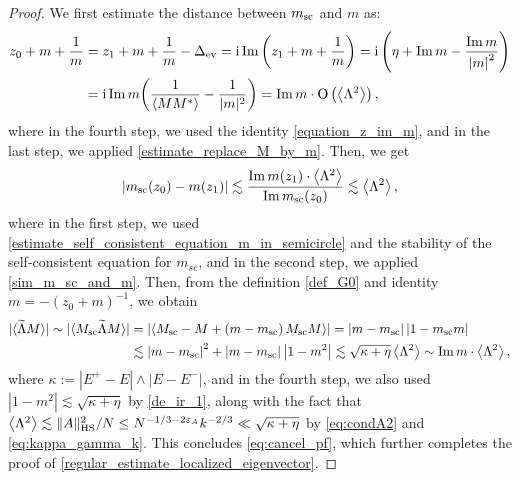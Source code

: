 \documentclass[10pt,reqno]{amsart}
\numberwithin{equation}{section}
\numberwithin{figure}{section}
\theoremstyle{plain} %
\theoremstyle{definition} %
\newcommand{\wt}{\widetilde}
\renewcommand{\txt}[1]{\text{\rm{#1}}}
\newcommand{\ii}{\mathrm{i}}
\renewcommand{\leq}{\le}
\newcommand{\pa}[1]{\left({#1}\right)}
\newcommand{\abs}[1]{\lvert #1 \rvert}
\newcommand{\absa}[1]{\left\lvert #1 \right\rvert}
\newcommand{\avg}[1]{\langle #1 \rangle}
\newcommand{\avga}[1]{\left\langle #1 \right\rangle}
\DeclareMathOperator{\im}{\mathrm{Im}}
\newcommand{\tLambda}{{\wt{\Lambda}}}
\newcommand{\OO}{\mathrm{O}}
\newcommand{\HS}{\txt{HS}}
\numberwithin{equation}{section}
\begin{document}
\begin{proof}
We first estimate the distance between $m_{\txt{sc}}$ and $m$ as:     \begin{equation}\label{estimate_self_consistent_equation_m_in_semicircle}
\begin{aligned}
z_0+m+\frac{1}{m}&=z_1+m+\frac{1}{m}-\Delta_{\txt{ev}}=\ii \im \pa{z_1+m+\frac{1}{m}}=\ii\pa{ \eta+\im m-\frac{\im m}{\absa{m}^2}}\\
&=\ii \im m\bigg(\frac{1}{\avga{MM^*}}-\frac{1}{|m|^2}\bigg)=\im m \cdot \OO\pa{\avga{\Lambda^2}},
\end{aligned}
\end{equation}
where in the fourth step, we used the identity \eqref{equation_z_im_m}, and in the last step, we applied \eqref{estimate_replace_M_by_m}. Then, we get  
    \begin{equation}\nonumber
        \begin{aligned}
            \absa{m_{\txt{sc}}(z_0)-m(z_1)}\lesssim \frac{\im m(z_1) \cdot \avga{\Lambda^2}}{\im m_{\txt{sc}}(z_0)}\lesssim\avga{\Lambda^2},
        \end{aligned}
    \end{equation}
where in the first step, we used \eqref{estimate_self_consistent_equation_m_in_semicircle} and the stability of the self-consistent equation for $m_{sc}$, and in the second step, we applied \eqref{sim_m_sc_and_m}. Then, from the definition \eqref{def_G0} and identity $m=-(z_0+m)^{-1}$, we obtain 
        \begin{align}
   \abs{\avg{\tLambda M}}\sim          \abs{\avg{M_{\txt{sc}}\tLambda M}}&=\absa{\avga{M_{\txt{sc}}-M+\pa{m-m_{\txt{sc}}}M_{\txt{sc}}M}}=\absa{m-m_{\txt{sc}}}\absa{1-m_{\txt{sc}}m}\nonumber\\
  &\lesssim \absa{m-m_{\txt{sc}}}^2+\absa{m-m_{\txt{sc}}}\absa{1-m^2}     \lesssim \sqrt{\kappa+\eta}\avga{\Lambda^2}\sim \im m \cdot \avga{\Lambda^2},
        \end{align}
    where $\kappa:=|E^+-E|\wedge|E-E^-|$, and in the fourth step, we also used $\absa{1-m^2}\lesssim \sqrt{\kappa+\eta}$ by \eqref{de_ir_1}, along with the fact that $\avga{\Lambda^2} \lesssim\|A\|_{\HS}^2/N\leq N^{-1/3-2\varepsilon_A}k^{-2/3}\ll\sqrt{\kappa+\eta}$ by \eqref{eq:condA2} and \eqref{eq:kappa_gamma_k}. This concludes \eqref{eq:cancel_pf}, which further completes the proof of \eqref{regular_estimate_localized_eigenvector}. 
 \end{proof}
\end{document}
